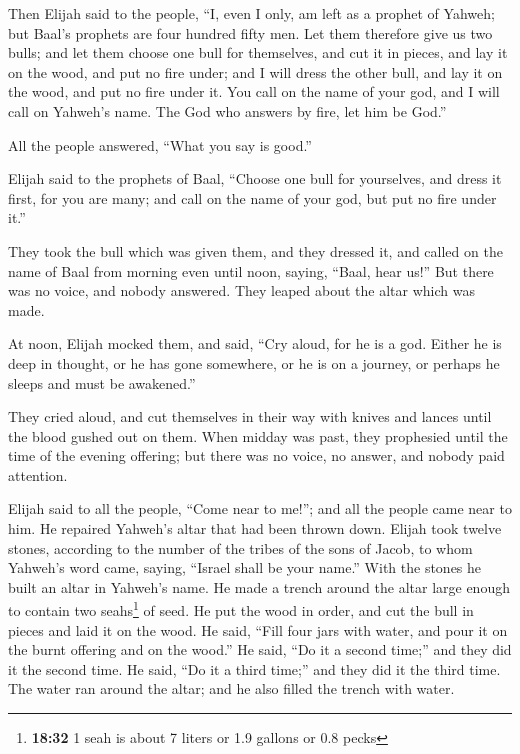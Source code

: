 \begin{paracol}{2}
\begin{otherlanguage}{english}
 Then Elijah said to the people, ``I, even I only, am
left as a prophet of Yahweh; but Baal's prophets are four hundred fifty
men.  Let them therefore give us two bulls; and let them
choose one bull for themselves, and cut it in pieces, and lay it on the
wood, and put no fire under; and I will dress the other bull, and lay it
on the wood, and put no fire under it.  You call on the
name of your god, and I will call on Yahweh's name. The God who answers
by fire, let him be God.''

All the people answered, ``What you say is good.''

 Elijah said to the prophets of Baal, ``Choose one bull
for yourselves, and dress it first, for you are many; and call on the
name of your god, but put no fire under it.''

 They took the bull which was given them, and they
dressed it, and called on the name of Baal from morning even until noon,
saying, ``Baal, hear us!'' But there was no voice, and nobody answered.
They leaped about the altar which was made.

 At noon, Elijah mocked them, and said, ``Cry aloud, for
he is a god. Either he is deep in thought, or he has gone somewhere, or
he is on a journey, or perhaps he sleeps and must be awakened.''

 They cried aloud, and cut themselves in their way with
knives and lances until the blood gushed out on them. 
When midday was past, they prophesied until the time of the evening
offering; but there was no voice, no answer, and nobody paid attention.

 Elijah said to all the people, ``Come near to me!''; and
all the people came near to him. He repaired Yahweh's altar that had
been thrown down.  Elijah took twelve stones, according
to the number of the tribes of the sons of Jacob, to whom Yahweh's word
came, saying, ``Israel shall be your name.''  With the
stones he built an altar in Yahweh's name. He made a trench around the
altar large enough to contain two seahs\footnote{\textbf{18:32} 1 seah
  is about 7 liters or 1.9 gallons or 0.8 pecks} of seed.
 He put the wood in order, and cut the bull in pieces and
laid it on the wood. He said, ``Fill four jars with water, and pour it
on the burnt offering and on the wood.''  He said, ``Do
it a second time;'' and they did it the second time. He said, ``Do it a
third time;'' and they did it the third time.  The water
ran around the altar; and he also filled the trench with water.


\end{otherlanguage}
\end{paracol}
